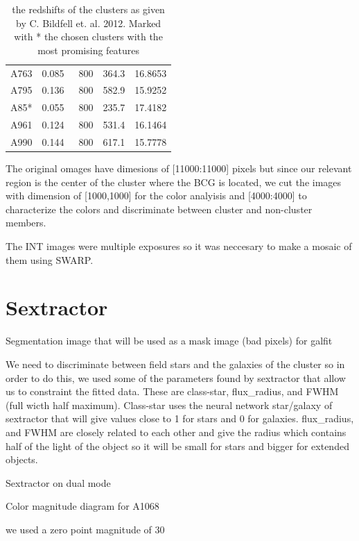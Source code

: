 \begin{table}[]
\begin{tabular}{ccccc}
A763    & 0.085 & ~800           & 364.3 & 16.8653   \\
A795    & 0.136 & ~800           & 582.9 & 15.9252   \\
A85*    & 0.055 & ~800           & 235.7 & 17.4182   \\
A961    & 0.124 & ~800           & 531.4 & 16.1464   \\
A990    & 0.144 & ~800           & 617.1 & 15.7778   
\end{tabular}
\caption{the redshifts of the clusters as given by C. Bildfell et. al. 2012. Marked with * the chosen clusters with the most promising features}
\label{my-label}
\end{table}

The original omages have dimesions of [11000:11000] pixels but since our relevant region is the center of the cluster where the BCG is located, we cut the images with dimension of [1000,1000] for the color analyisis and [4000:4000] to characterize the colors and discriminate between cluster and non-cluster members.

The INT images were multiple exposures so it was neccesary to make a mosaic of them using SWARP.

\section{Sextractor}

Segmentation image that will be used as a mask image (bad pixels) for galfit

We need to discriminate between field stars and the galaxies of the cluster so in order to do this, we used some of the parameters found by sextractor that allow us to constraint the fitted data. These are class-star, flux\_radius, and FWHM (full wicth half maximum). Class-star uses the neural network star/galaxy of sextractor that will give values close to 1 for stars and 0 for galaxies. flux\_radius, and FWHM are closely related to each other and give the radius which contains half of the light of the object so it will be small for stars and bigger for extended objects.

Sextractor on dual mode



Color magnitude diagram for A1068

we used a zero point magnitude of 30

